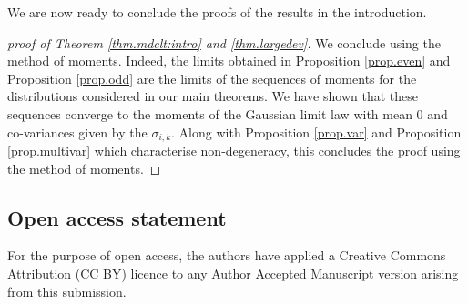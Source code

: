 \documentclass[12pt,a4paper,reqno]{amsart}
\begin{document}
We are now ready to conclude the proofs of the results in the introduction.
\begin{proof}[proof of Theorem \ref{thm.mdclt:intro} and \ref{thm.largedev}]
We conclude using the method of moments. Indeed, the limits obtained in Proposition \ref{prop.even} and Proposition \ref{prop.odd} are the limits of the sequences of moments for the distributions considered in our main theorems. We have shown that these sequences converge to the moments of the Gaussian limit law with mean $0$ and co-variances given by the $\sigma_{i,k}$. Along with  Proposition \ref{prop.var} and Proposition \ref{prop.multivar} which characterise non-degeneracy, this concludes the proof using the method of moments.
\end{proof}







\subsection*{Open access statement}
For the purpose of open access, the authors have applied a Creative Commons Attribution (CC BY) licence to any Author Accepted Manuscript version arising from this submission.




\end{document}
